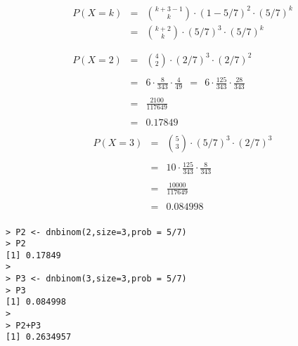 \documentclass[a4paper,12pt]{article}
\begin{document}
\begin{eqnarray*}
P(X=k)&=&{k+3-1 \choose k}\cdot(1-5/7)^{2}\cdot(5/7)^{k}\\
&=&{k+2 \choose k}\cdot (5/7)^{3}\cdot (5/7)^{k}\\
& & \\
& & \\
P(X=2) &=&{4 \choose 2}\cdot (2/7)^{3}\cdot (2/7)^{2}\\
& & \\ 
&=& 6\cdot \frac{8}{343}\cdot \frac{4}{49}\ \ = \ \ 6\cdot \frac{125}{343}\cdot \frac{28}{343}\\
& & \\ 
&=& \frac{2100}{117649}\\
& & \\
&=& 0.17849\\
\end{eqnarray*}
\begin{eqnarray*}
P(X=3) &=&{5 \choose 3}\cdot (5/7)^{3}\cdot (2/7)^{3}\\
& & \\ 
&=& 10\cdot \frac{125}{343}\cdot \frac{8}{343}\\
& & \\ 
&=& \frac{10000}{117649}\\
& & \\
&=& 0.084998\\
\end{eqnarray*}

\newpage 
\begin{verbatim}
> P2 <- dnbinom(2,size=3,prob = 5/7) 
> P2
[1] 0.17849
>
> P3 <- dnbinom(3,size=3,prob = 5/7) 
> P3
[1] 0.084998
>
> P2+P3
[1] 0.2634957
\end{verbatim}
\end{document}

